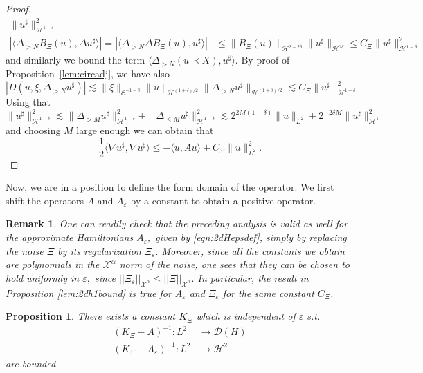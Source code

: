 \documentclass[11pt, oneside]{article}   	%
\newtheorem{proposition}[theorem]{Proposition}
\newtheorem{remark}[theorem]{Remark}
\newcommand{\CC}{\mathscr{C}}
\newcommand{\ssp}{\mathscr{H}}
\begin{document}
\begin{proof}
\begin{align*}
	\| u^{\sharp} \|_{\ssp^{1 - \delta}}^2 \\
	 | \langle \Delta_{> N} B_{\Xi} (u), \Delta u^{\sharp} \rangle | = |
	\langle \Delta_{> N} \Delta B_{\Xi} (u), u^{\sharp} \rangle | &\le
	\| B_{\Xi} (u) \|_{\ssp^{2 - 2 \delta}} \| u^{\sharp} \|_{\ssp^{2 \delta}}
	\le C_{\Xi} \| u^{\sharp} \|_{\ssp^{1 - \delta}}^2 \end{align*}
	and similarly we bound the term $\langle\Delta_{>N}(u\prec X),u^\sharp\rangle$.
	 By proof of Proposition~\ref{lem:circadj}, we have also
	\[ | D (u, \xi, \Delta_{> N} u^{\sharp}) | \lesssim \| \xi \|_{\CC^{- 1 -
			\delta}} \| u \|_{\ssp^{(1 + \delta) / 2}} \| \Delta_{> N} u^{\sharp}
	\|_{\ssp^{(1 + \delta) / 2}} \lesssim C_{\Xi} \| u^{\sharp} \|_{\ssp^{1 -
			\delta}}^2 \]
	Using that
	\[ \| u^{\sharp} \|_{\ssp^{1 - \delta}}^2 \lesssim \| \Delta_{> M} u^{\sharp}
	\|_{\ssp^{1 - \delta}}^2 + \| \Delta_{\le M} u^{\sharp} \|_{\ssp^{1 -
			\delta}}^2 \lesssim 2^{2 M (1 - \delta)} \| u \|_{L^2} + 2^{- 2 \delta M}
	\| u^{\sharp} \|_{\ssp^1}^2 \]
	and choosing $M$ large enough we can obtain that
	\[ \frac{1}{2} \langle \nabla u^{\sharp}, \nabla u^{\sharp} \rangle
	\le - \langle u, A u \rangle + C_{\Xi} \| u \|_{L^2}^2. \]
\end{proof}

Now, we are in a position to define the form domain of the operator.  We first shift the operators $A$ and $A_\varepsilon$ by a constant to obtain a positive operator.

\begin{remark}\upshape\label{rem:2deps} \upshape
	One can readily check that the preceding analysis is valid as well for the approximate Hamiltonians $A_\varepsilon,$ given by \eqref{eqn:2dHepsdef}, simply by replacing the noise $\Xi$ by its regularization $\Xi_\varepsilon.$ Moreover, since all the constants we obtain are polynomials in the $\mathscr{X}^\alpha$ norm of the noise, one sees that they can be chosen to hold uniformly in $\varepsilon,$ since $||\Xi_\varepsilon||_{\mathscr{X}^\alpha}\le||\Xi||_{\mathscr{X}^\alpha}.$  In particular, the result in Proposition \ref{lem:2dh1bound} is true for $A_\varepsilon$ and $\Xi_\varepsilon$ for the same constant $C_\Xi$.
\end{remark}

	\begin{proposition}\label{lem:laxmil}
	There exists a constant $K_\Xi$ which is independent of $\varepsilon$ s.t. 
	\begin{align}
	(K_{\Xi} - A)^{- 1} : L^2 & \rightarrow  \mathscr{D} (H) \label{shift1} \\	
	(K_{\Xi} - A_{\varepsilon})^{- 1} : L^2 & \rightarrow  \ssp^2 \label{shift2}
	\end{align}
	are bounded.
\end{proposition}
\end{document}
